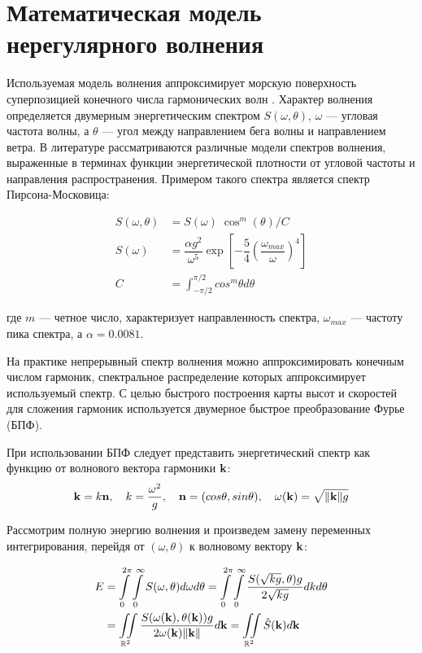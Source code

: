 \section{Математическая модель нерегулярного волнения}

Используемая модель волнения аппроксимирует морскую поверхность суперпозицией конечного числа гармонических волн \citep{lopatuhin2004}. Характер волнения определяется двумерным энергетическим спектром $S(\omega, \theta)$, $\omega$ --- угловая частота волны, а $\theta$ --- угол между направлением бега волны и направлением ветра. В литературе \citep{lopatuhin2004} рассматриваются различные модели спектров волнения, выраженные в терминах функции энергетической плотности от угловой частоты и направления распространения. Примером такого спектра является спектр Пирсона-Московица:

\begin{equation}
	\label{envmath2:spectra}
	\begin{split}
	S(\omega, \theta) &= S(\omega) \; \cos^m (\theta) / C \\
	S(\omega) &= \dfrac{\alpha g^2}{\omega^5} \exp \left[ 
	  -\dfrac{5}{4} \left( \dfrac{\omega_{max}}{\omega} \right)^{4} 
	\right]  \\
	C &= \int_{-\pi/2}^{\pi/2} cos^m\theta d\theta
	\end{split}
\end{equation}

где $m$ --- четное число, характеризует направленность спектра, $\omega_{max}$ --- частоту пика спектра, а $\alpha = 0.0081$.

На практике непрерывный спектр волнения можно аппроксимировать конечным числом гармоник, спектральное распределение которых аппроксимирует используемый спектр. С целью быстрого построения карты высот и скоростей для сложения гармоник используется двумерное быстрое преобразование Фурье (БПФ).
 
При использовании БПФ следует представить энергетический спектр как функцию от волнового вектора гармоники $\mathbf{k}$:
$$ \mathbf{k} = k\mathbf{n},\quad 
k = \frac{\omega^2}{g} ,\quad 
\mathbf{n}=(cos \theta, sin \theta), \quad 
\omega(\mathbf{k}) = \sqrt{\lVert \mathbf{k} \rVert g} $$

Рассмотрим полную энергию волнения и произведем замену переменных интегрирования, перейдя от $(\omega, \theta)$ к волновому вектору $\mathbf{k}$:

\begin{equation}
	\begin{split}
	E &= \int\limits_0^{2\pi}
		 \int\limits_0^\infty S(\omega, \theta) d\omega d\theta
	  = \int\limits_0^{2\pi}
		 \int\limits_0^\infty 
			 \frac {S(\sqrt{kg}, \theta)g} {2\sqrt{kg}} dk d\theta\\
	  &= \iint\limits_{\mathbb{R}^2}
			 \frac{S(\omega(\mathbf{k}), \theta(\mathbf{k})) g}
				  {2\omega(\mathbf{k}) \lVert \mathbf{k} \rVert} d\mathbf{k}
	  = \iint\limits_{\mathbb{R}^2} \hat{S}(\mathbf{k})d\mathbf{k}
	\end{split}
\end{equation}

